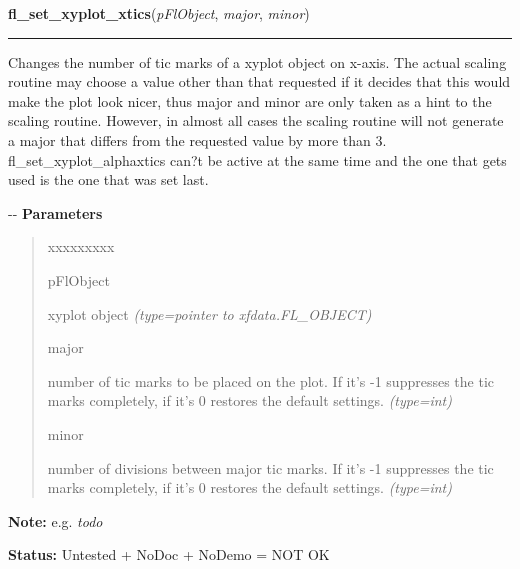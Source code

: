     \label{xformslib:flxyplot:fl_set_xyplot_xtics}

    \vspace{0.5ex}

\hspace{.8\funcindent}\begin{boxedminipage}{\funcwidth}

    \raggedright \textbf{fl\_set\_xyplot\_xtics}(\textit{pFlObject}, \textit{major}, \textit{minor})

    \vspace{-1.5ex}

    \rule{\textwidth}{0.5\fboxrule}
\setlength{\parskip}{2ex}

Changes the number of tic marks of a xyplot object on x-axis. The
actual scaling routine may choose a value other than that requested if it
decides that this would make the plot look nicer, thus major and minor
are only taken as a hint to the scaling routine. However, in almost all
cases the scaling routine will not generate a major that differs from the
requested value by more than 3. fl\_set\_xyplot\_alphaxtics can?t be active
at the same time and the one that gets used is the one that was set last.

-{}-
\setlength{\parskip}{1ex}
      \textbf{Parameters}
      \vspace{-1ex}

      \begin{quote}
        \begin{Ventry}{xxxxxxxxx}

          \item[pFlObject]


xyplot object
            {\it (type=pointer to xfdata.FL\_OBJECT)}

          \item[major]


number of tic marks to be placed on the plot. If it's -1 suppresses
the tic marks completely, if it's 0 restores the default settings.
            {\it (type=int)}

          \item[minor]


number of divisions between major tic marks. If it's -1 suppresses
the tic marks completely, if it's 0 restores the default settings.
            {\it (type=int)}

        \end{Ventry}

      \end{quote}

\textbf{Note:} 
e.g. \emph{todo}


\textbf{Status:} 
Untested + NoDoc + NoDemo = NOT OK


    \end{boxedminipage}

